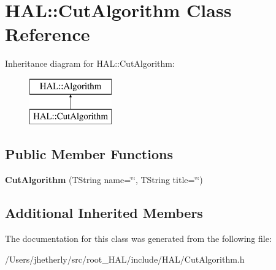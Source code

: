 \hypertarget{class_h_a_l_1_1_cut_algorithm}{\section{H\-A\-L\-:\-:Cut\-Algorithm Class Reference}
\label{class_h_a_l_1_1_cut_algorithm}
}
Inheritance diagram for H\-A\-L\-:\-:Cut\-Algorithm\-:\begin{figure}[H]
\begin{center}
\leavevmode
\includegraphics[height=2.000000cm]{class_h_a_l_1_1_cut_algorithm}
\end{center}
\end{figure}
\subsection*{Public Member Functions}
\begin{DoxyCompactItemize}
\item 
\hypertarget{class_h_a_l_1_1_cut_algorithm_a7009161a2b8463fddb9d6336cb2ef669}{{\bfseries Cut\-Algorithm} (T\-String name=\char`\"{}\char`\"{}, T\-String title=\char`\"{}\char`\"{})}\label{class_h_a_l_1_1_cut_algorithm_a7009161a2b8463fddb9d6336cb2ef669}

\end{DoxyCompactItemize}
\subsection*{Additional Inherited Members}


The documentation for this class was generated from the following file\-:\begin{DoxyCompactItemize}
\item 
/\-Users/jhetherly/src/root\-\_\-\-H\-A\-L/include/\-H\-A\-L/Cut\-Algorithm.\-h\end{DoxyCompactItemize}
